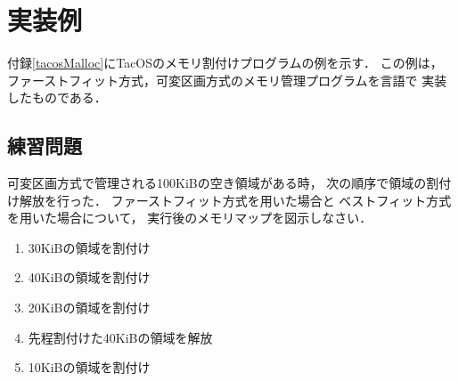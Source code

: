 \section{実装例}
付録\ref{tacosMalloc}にTacOSのメモリ割付けプログラムの例を示す．
この例は，
ファーストフィット方式，可変区画方式のメモリ管理プログラムを{\cmm}言語で
実装したものである．

\subsection*{練習問題}
可変区画方式で管理される100KiBの空き領域がある時，
次の順序で領域の割付け解放を行った．
ファーストフィット方式を用いた場合と
ベストフィット方式を用いた場合について，
実行後のメモリマップを図示しなさい．

\begin{enumerate}
\item 30KiBの領域を割付け
\item 40KiBの領域を割付け
\item 20KiBの領域を割付け
\item 先程割付けた40KiBの領域を解放
\item 10KiBの領域を割付け
\end{enumerate}
